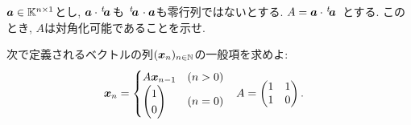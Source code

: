 \begin{quiz}
  $\boldsymbol{a}\in\mathbb{K}^{n\times 1}$とし,
  $\boldsymbol{a}\cdot{\left.^{t}\!\boldsymbol{a}\right.}$も
  ${\left.^{t}\!\boldsymbol{a}\right.}\cdot\boldsymbol{a}$も零行列ではないとする.
  $A=\boldsymbol{a}\cdot{\left.^{t}\!\boldsymbol{a}\right.}$
  とする.
  このとき,
  $A$は対角化可能であることを示せ.
\end{quiz}


\begin{quiz}
  次で定義されるベクトルの列$(\boldsymbol{x}_n)_{n\in\mathbb{N}}$の一般項を求めよ:
  \begin{align*}
    \boldsymbol{x}_n &=
    \begin{cases}
      A\boldsymbol{x}_{n-1} & (n>0)\\
      \begin{pmatrix}1\\0\end{pmatrix} & (n=0)
    \end{cases}
    &
    A&=\begin{pmatrix}1&1\\1&0\end{pmatrix}.
  \end{align*}
\end{quiz}


